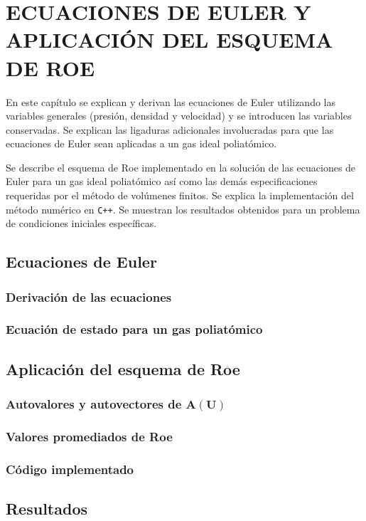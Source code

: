 \chapter{ECUACIONES DE EULER Y APLICACIÓN DEL ESQUEMA DE ROE}

En este capítulo se explican y derivan las ecuaciones de Euler utilizando las variables generales (presión, densidad y velocidad) y se introducen las variables conservadas. Se explican las ligaduras adicionales involucradas para que las ecuaciones de Euler sean aplicadas a un gas ideal poliatómico.

Se describe el esquema de Roe implementado en la solución de las ecuaciones de Euler para un gas ideal poliatómico así como las demás especificaciones requeridas por el método de volúmenes finitos. Se explica la implementación del método numérico en \texttt{C++}. Se muestran los resultados obtenidos para un problema de condiciones iniciales específicas.
\section{Ecuaciones de Euler}
\subsection{Derivación de las ecuaciones}
\subsection{Ecuación de estado para un gas poliatómico}
\section{Aplicación del esquema de Roe}
\subsection{Autovalores y autovectores de $\mathbf{A}(\mathbf{U})$}
\subsection{Valores promediados de Roe}
\subsection{Código implementado}
\section{Resultados}
